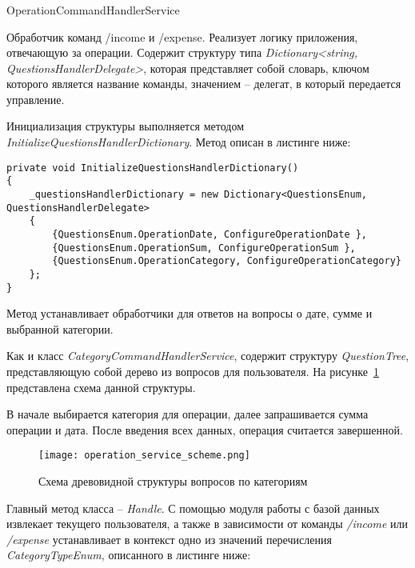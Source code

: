 \vskip 1.2in

\subsubsection{} OperationCommandHandlerService
\label{sec:design:server:OperationCommandHandlerService}

Обработчик команд /income и /expense. Реализует логику приложения,
отвечающую за операции. Содержит структуру типа \emph{Dictionary<string,
QuestionsHandlerDelegate>}, которая представляет собой словарь, ключом
которого является название команды, значением – делегат, в который
передается управление.

Инициализация структуры выполняется методом \linebreak
\emph{InitializeQuestionsHandlerDictionary}. Метод описан в листинге ниже:

\lstset{style=sharpc}
\begin{lstlisting}
private void InitializeQuestionsHandlerDictionary()
{
	_questionsHandlerDictionary = new Dictionary<QuestionsEnum, QuestionsHandlerDelegate>
	{
		{QuestionsEnum.OperationDate, ConfigureOperationDate },
		{QuestionsEnum.OperationSum, ConfigureOperationSum },
		{QuestionsEnum.OperationCategory, ConfigureOperationCategory}
	};
}
\end{lstlisting}

Метод устанавливает обработчики для ответов на вопросы о дате, сумме и выбранной категории. 

Как и класс \emph{CategoryCommandHandlerService}, содержит структуру
\linebreak \emph{QuestionTree}, представляющую собой дерево из вопросов для пользователя. На рисунке~\ref{fig:design:server:operation_service_scheme} представлена схема данной структуры.

В начале выбирается категория для операции, далее запрашивается
сумма операции и дата. После введения всех данных, операция считается завершенной.

\begin{figure}[!h]
\centering
	\texttt{[image: operation\_service\_scheme.png]}
	\caption{Схема древовидной структуры вопросов по категориям}
	\label{fig:design:server:operation_service_scheme}
\end{figure}

Главный метод класса – \emph{Handle}. С помощью модуля работы с базой
данных извлекает текущего пользователя, а также в зависимости от команды \emph{/income} или \emph{/expense} устанавливает в контекст одно из значений перечисления \emph{CategoryTypeEnum}, описанного в листинге ниже:


